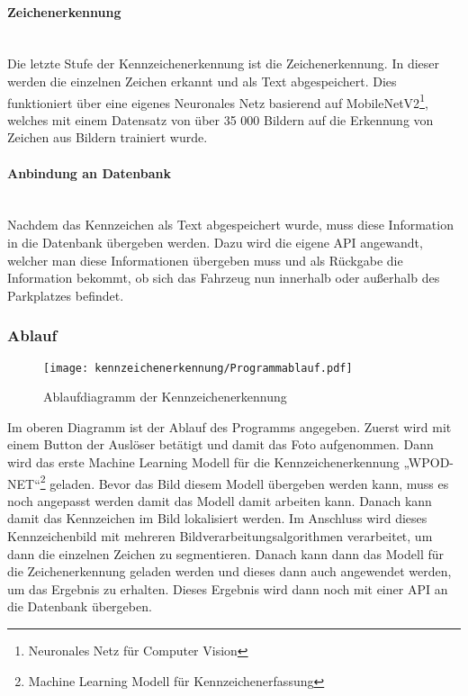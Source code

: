 \paragraph{Zeichenerkennung}\mbox{}\\
Die letzte Stufe der Kennzeichenerkennung ist die Zeichenerkennung. In dieser werden die einzelnen Zeichen erkannt und als Text 
abgespeichert. Dies funktioniert über eine eigenes Neuronales Netz basierend auf MobileNetV2\footnote{Neuronales Netz für Computer Vision}, welches mit einem Datensatz von 
über 35 000 Bildern auf die Erkennung von Zeichen aus Bildern trainiert wurde.

\paragraph{Anbindung an Datenbank}\mbox{}\\
Nachdem das Kennzeichen als Text abgespeichert wurde, muss diese Information in die Datenbank übergeben werden. Dazu wird die 
eigene API angewandt, welcher man diese Informationen übergeben muss und als Rückgabe die Information bekommt, ob sich das 
Fahrzeug nun innerhalb oder außerhalb des Parkplatzes befindet.

\subsubsection{Ablauf}

\begin{figure}[H]
    \centering
    \texttt{[image: kennzeichenerkennung/Programmablauf.pdf]}
    \caption{Ablaufdiagramm der Kennzeichenerkennung}
\end{figure}

Im oberen Diagramm ist der Ablauf des Programms angegeben. Zuerst wird mit einem Button der Auslöser betätigt und damit das 
Foto aufgenommen. Dann wird das erste Machine Learning Modell für die Kennzeichenerkennung „WPOD-NET“\footnote{Machine Learning Modell für Kennzeichenerfassung} geladen. Bevor das 
Bild diesem Modell übergeben werden kann, muss es noch angepasst werden damit das Modell damit arbeiten kann. Danach kann 
damit das Kennzeichen im Bild lokalisiert werden. Im Anschluss wird dieses Kennzeichenbild mit mehreren Bildverarbeitungsalgorithmen 
verarbeitet, um dann die einzelnen Zeichen zu segmentieren. Danach kann dann das Modell für die Zeichenerkennung geladen 
werden und dieses dann auch angewendet werden, um das Ergebnis zu erhalten. Dieses Ergebnis wird dann noch mit einer API an die Datenbank übergeben.

